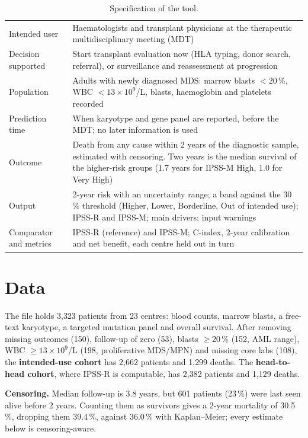 \documentclass[11pt,a4paper]{article}
\begin{document}
\begin{table}[h]
\centering\small
\caption{Specification of the tool.}\label{tab:spec}
\begin{tabularx}{\textwidth}{@{}p{3.1cm}L@{}}
\toprule
Intended user & Haematologists and transplant physicians at the therapeutic multidisciplinary meeting (MDT)\\
Decision supported & Start transplant evaluation now (HLA typing, donor search, referral), or surveillance and reassessment at progression\\
Population & Adults with newly diagnosed MDS: marrow blasts $<20$\,\%, WBC $<13\times10^9$/L, blasts, haemoglobin and platelets recorded\\
Prediction time & When karyotype and gene panel are reported, before the MDT; no later information is used\\
Outcome & Death from any cause within 2 years of the diagnostic sample, estimated with censoring. Two years is the median survival of the higher-risk groups (1.7 years for IPSS-M High, 1.0 for Very High)\\
Output & 2-year risk with an uncertainty range; a band against the 30\,\% threshold (Higher, Lower, Borderline, Out of intended use); IPSS-R and IPSS-M; main drivers; input warnings\\
Comparator and metrics & IPSS-R (reference) and IPSS-M; C-index, 2-year calibration and net benefit, each centre held out in turn\\
\bottomrule
\end{tabularx}
\end{table}

\section{Data}
The file holds 3{,}323 patients from 23 centres: blood counts, marrow blasts, a free-text karyotype, a targeted mutation panel and overall survival. After removing missing outcomes (150), follow-up of zero (53), blasts $\geq 20$\,\% (152, AML range), WBC $\geq 13\times10^9$/L (198, proliferative MDS/MPN) and missing core labs (108), the \textbf{intended-use cohort} has 2{,}662 patients and 1{,}299 deaths. The \textbf{head-to-head cohort}, where IPSS-R is computable, has 2{,}382 patients and 1{,}129 deaths.

\textbf{Censoring.} Median follow-up is 3.8 years, but 601 patients (23\,\%) were last seen alive before 2 years. Counting them as survivors gives a 2-year mortality of 30.5\,\%, dropping them 39.4\,\%, against 36.0\,\% with Kaplan--Meier; every estimate below is censoring-aware.
\end{document}
